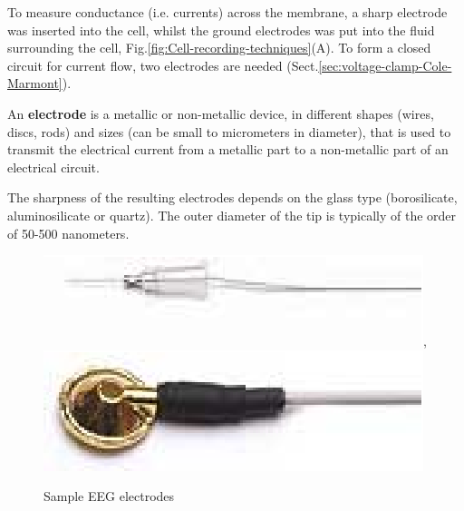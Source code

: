 To measure conductance (i.e. currents) across the membrane, a sharp electrode
was inserted into the cell, whilst the ground electrodes was put into the fluid
surrounding the cell, Fig.\ref{fig:Cell-recording-techniques}(A).
To form a closed circuit for current flow, two electrodes are needed
(Sect.\ref{sec:voltage-clamp-Cole-Marmont}).

\begin{mdframed}
An {\bf electrode} is a metallic or non-metallic device, in different shapes
(wires, discs, rods) and sizes (can be small to micrometers in diameter), that
is used to transmit the electrical current from a metallic part to a
non-metallic part of an electrical circuit.

The sharpness of the resulting electrodes depends on the glass type
(borosilicate, aluminosilicate or quartz). The outer diameter of the tip is
typically of the order of 50-500 nanometers.
\end{mdframed}

\begin{figure}[htb]
  \centerline{\includegraphics{./images/EEG_electrode_DEN-12SAF.eps},
  \includegraphics{./images/EEG_electrode_GH-48S.eps}}
  \caption{Sample EEG electrodes}\label{fig:EEG-electrode}
\end{figure}

